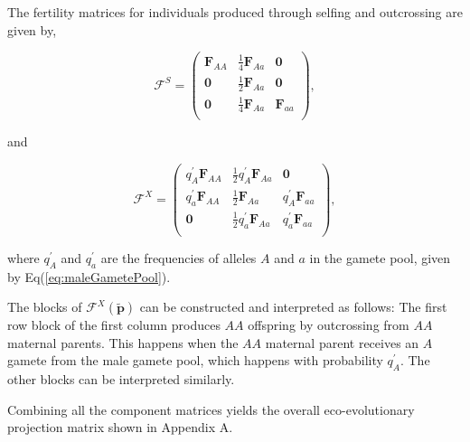 \documentclass[11pt]{article}
\def\mbf#1{\mathbf{#1}}
\def\mcal#1{\mathcal{#1}}
\begin{document}
The fertility matrices for individuals produced through selfing and outcrossing are given by, 
\begin{linenomath*}
\begin{equation} \label{eq:BlkFS}
	\mcal{F}^S = 
			\left(
			\begin{array}{ccc}
				\mbf{F}_{AA} & \frac{1}{4} \mbf{F}_{Aa} & \mbf{0}  \\
				\mbf{0}  & \frac{1}{2} \mbf{F}_{Aa} & \mbf{0}  \\
				\mbf{0} & \frac{1}{4} \mbf{F}_{Aa} & \mbf{F}_{aa}\\
			\end{array} \right), 
\end{equation}
\end{linenomath*}
\noindent and 
\begin{linenomath*}
\begin{equation} \label{eq:BlkFX}
	\mcal{F}^X = 
			\left(
			\begin{array}{ccc}
				q^{\prime}_{A} \mbf{F}_{AA} & \frac{1}{2} q^{\prime}_{A} \mbf{F}_{Aa} & \mbf{0}  \\ 
				q^{\prime}_{a} \mbf{F}_{AA} & \frac{1}{2} \mbf{F}_{Aa} & q^{\prime}_{A} \mbf{F}_{aa}  \\ 
				\mbf{0}  & \frac{1}{2} q^{\prime}_{a} \mbf{F}_{Aa} & q^{\prime}_{a} \mbf{F}_{aa}  \\
			\end{array} \right),
\end{equation}
\end{linenomath*}
\noindent where $q^{\prime}_A$ and $q^{\prime}_a$ are the frequencies of alleles $A$ and $a$ in the gamete pool, given by Eq(\ref{eq:maleGametePool}). 

The blocks of $\mcal{F}^X(\tilde{\mbf{p}})$ can be constructed and interpreted as follows: The first row block of the first column produces $AA$ offspring by outcrossing from $AA$ maternal parents. This happens when the $AA$ maternal parent receives an $A$ gamete from the male gamete pool, which happens with probability $q^{\prime}_{A}$. The other blocks can be interpreted similarly.

Combining all the component matrices yields the overall eco-evolutionary projection matrix shown in Appendix A.
\end{document}

